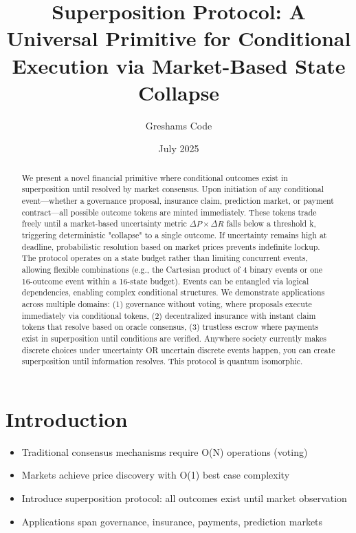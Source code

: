 \documentclass{article}
\title{Superposition Protocol: A Universal Primitive for Conditional Execution via Market-Based State Collapse}
\author[1]{Greshams Code}
\affil[1]{Founder, \href{https://govex.ai}{Govex.ai}}
\date{July 2025}
\begin{document}
\maketitle

\begin{abstract}
We present a novel financial primitive where conditional outcomes exist in superposition until resolved by market consensus. Upon initiation of any conditional event—whether a governance proposal, insurance claim, prediction market, or payment contract—all possible outcome tokens are minted immediately. These tokens trade freely until a market-based uncertainty metric $\Delta P \times \Delta R$ falls below a threshold k, triggering deterministic "collapse" to a single outcome. If uncertainty remains high at deadline, probabilistic resolution based on market prices prevents indefinite lockup.
The protocol operates on a state budget rather than limiting concurrent events, allowing flexible combinations (e.g., the Cartesian product of 4 binary events or one 16-outcome event within a 16-state budget). Events can be entangled via logical dependencies, enabling complex conditional structures.
We demonstrate applications across multiple domains: (1) governance without voting, where proposals execute immediately via conditional tokens, (2) decentralized insurance with instant claim tokens that resolve based on oracle consensus, (3) trustless escrow where payments exist in superposition until conditions are verified. Anywhere society currently makes discrete choices under uncertainty OR uncertain discrete events happen, you can create superposition until information resolves. This protocol is quantum isomorphic.
\end{abstract}


\section{Introduction}
\begin{itemize}
   \item Traditional consensus mechanisms require O(N) operations (voting)
   \item Markets achieve price discovery with O(1) best case complexity
   \item Introduce superposition protocol: all outcomes exist until market observation
   \item Applications span governance, insurance, payments, prediction markets
\end{itemize}
\end{document}
